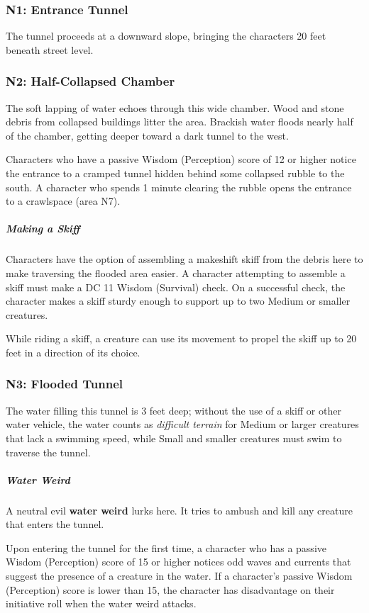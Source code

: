 \documentclass[10pt,a4paper,twoside,fancy,bg=print,twocolumn,openany,nodeprecatedcode]{dndbook}
\begin{document}
\subsubsection{N1: Entrance Tunnel}
The tunnel proceeds at a downward slope, bringing the characters 20 feet beneath street level.

\subsubsection{N2: Half-Collapsed Chamber}
\begin{DndReadAloud}{}
The soft lapping of water echoes through this wide chamber. Wood and stone debris from collapsed buildings litter the area. Brackish water floods nearly half of the chamber, getting deeper toward a dark tunnel to the west.

\end{DndReadAloud}

Characters who have a passive Wisdom (Perception) score of 12 or higher notice the entrance to a cramped tunnel hidden behind some collapsed rubble to the south. A character who spends 1 minute clearing the rubble opens the entrance to a crawlspace (area N7).

\subparagraph{Making a Skiff}
Characters have the option of assembling a makeshift skiff from the debris here to make traversing the flooded area easier. A character attempting to assemble a skiff must make a DC 11 Wisdom (Survival) check. On a successful check, the character makes a skiff sturdy enough to support up to two Medium or smaller creatures.

While riding a skiff, a creature can use its movement to propel the skiff up to 20 feet in a direction of its choice.

\subsubsection{N3: Flooded Tunnel}
The water filling this tunnel is 3 feet deep; without the use of a skiff or other water vehicle, the water counts as \textit{difficult terrain} for Medium or larger creatures that lack a swimming speed, while Small and smaller creatures must swim to traverse the tunnel.

\subparagraph{Water Weird}
A neutral evil \textbf{water weird} lurks here. It tries to ambush and kill any creature that enters the tunnel.

Upon entering the tunnel for the first time, a character who has a passive Wisdom (Perception) score of 15 or higher notices odd waves and currents that suggest the presence of a creature in the water. If a character's passive Wisdom (Perception) score is lower than 15, the character has disadvantage on their initiative roll when the water weird attacks.
\end{document}
